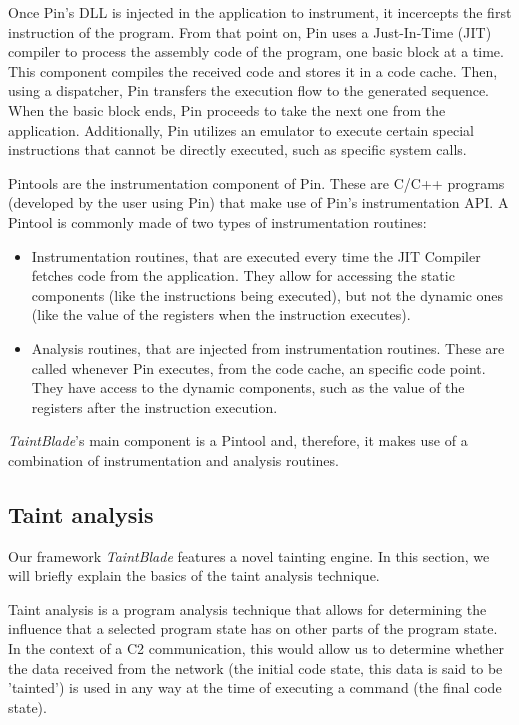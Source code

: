 \documentclass[conference]{IEEEtran}
\begin{document}
Once Pin's DLL is injected in the application to instrument, it incercepts the
first instruction of the program. From that point on, Pin uses a Just-In-Time
(JIT) compiler to process the assembly code of the program, one basic block at
a time. This component compiles the received code and stores it in a code
cache. Then, using a dispatcher, Pin transfers the execution flow to the
generated sequence. When the basic block ends, Pin proceeds to take the next
one from the application. Additionally, Pin utilizes an emulator to execute
certain special instructions that cannot be directly executed, such as specific
system calls.

Pintools are the instrumentation component of Pin. These are C/C++ programs
(developed by the user using Pin) that make use of Pin's instrumentation API. A
Pintool is commonly made of two types of instrumentation routines:
\begin{itemize}
    \item Instrumentation routines, that are executed every time the JIT Compiler fetches
          code from the application. They allow for accessing the static components (like
          the instructions being executed), but not the dynamic ones (like the value of
          the registers when the instruction executes).
    \item Analysis routines, that are injected from instrumentation routines. These are
          called whenever Pin executes, from the code cache, an specific code point. They
          have access to the dynamic components, such as the value of the registers after
          the instruction execution.
\end{itemize}

\textit{TaintBlade}'s main component is a Pintool and, therefore, it makes use of a combination of
instrumentation and analysis routines.

\subsection {Taint analysis}\label{subsec:taint_analysis}
Our framework \textit{TaintBlade} features a novel tainting engine. In this
section, we will briefly explain the basics of the taint analysis technique.

Taint analysis is a program analysis technique that allows for determining the
influence that a selected program state has on other parts of the program
state\cite{book_practical_binary_analysis}. In the context of a C2
communication, this would allow us to determine whether the data received from
the network (the initial code state, this data is said to be 'tainted') is used
in any way at the time of executing a command (the final code state).
\end{document}
